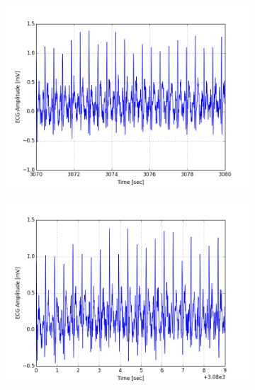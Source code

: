 \documentclass[paper=a4, fontsize=11pt]{scrartcl}
\numberwithin{equation}{section}		%
\numberwithin{figure}{section}			%
\numberwithin{table}{section}		    %
\begin{document}
\begin{appendices}
\begin{figure}[H]
	\centering
	\begin{subfigure}[b]{0.3\textwidth}
		\includegraphics[width=\textwidth]{sim/ecg_61}
	\end{subfigure}
	\begin{subfigure}[b]{0.3\textwidth}
		\includegraphics[width=\textwidth]{sim/ecg_62}
	\end{subfigure}
	\begin{subfigure}[b]{0.3\textwidth}

\end{subfigure}
\end{figure}
\end{appendices}
\end{document}

